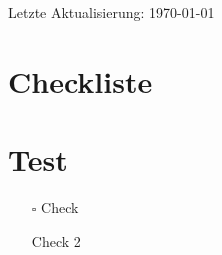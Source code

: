 \documentclass[a4paper,11pt]{article}
\newcommand{\checkbox}{$\square$}
\begin{document}
{\small\textcolor{gray!90}{Letzte Aktualisierung: \today}}

\section*{Checkliste}

\section*{Test}
\begin{itemize}
    \item[\checkbox] Check
    \item[\checkmark] Check 2 
\end{itemize}
\end{document}
